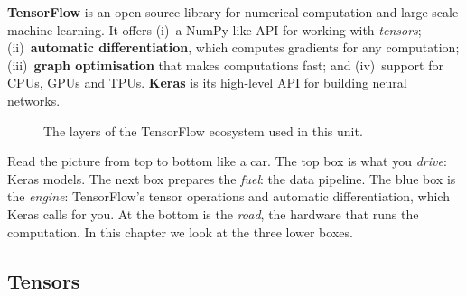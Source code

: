 \begin{definition}[: TensorFlow]
\textbf{TensorFlow} is an open-source library for numerical computation and large-scale machine learning. It offers (i)~a NumPy-like API for working with \emph{tensors}; (ii)~\textbf{automatic differentiation}, which computes gradients for any computation; (iii)~\textbf{graph optimisation} that makes computations fast; and (iv)~support for CPUs, GPUs and TPUs. \textbf{Keras} is its high-level API for building neural networks.
\end{definition}

\begin{figure}[!htbp]
\centering
{}
\caption{The layers of the TensorFlow ecosystem used in this unit.}\label{fig:tfstack}
\end{figure}

\begin{explain}
Read the picture from top to bottom like a car. The top box is what you \emph{drive}: Keras models. The next box prepares the \emph{fuel}: the data pipeline. The blue box is the \emph{engine}: TensorFlow's tensor operations and automatic differentiation, which Keras calls for you. At the bottom is the \emph{road}, the hardware that runs the computation. In this chapter we look at the three lower boxes.
\end{explain}

\subsection{Tensors}

